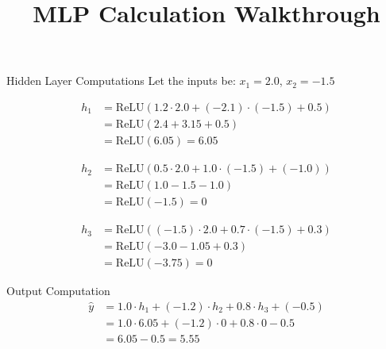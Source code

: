 \documentclass{beamer}
\title{MLP Calculation Walkthrough}
\author{}
\date{}
\begin{document}
\frame{\titlepage}

\begin{frame}{Hidden Layer Computations}
Let the inputs be: $x_1 = 2.0$, $x_2 = -1.5$

\begin{tcolorbox}[title=Neuron 1]
\begin{align*}
h_1 &= \text{ReLU}(1.2 \cdot 2.0 + (-2.1) \cdot (-1.5) + 0.5) \\
    &= \text{ReLU}(2.4 + 3.15 + 0.5) \\
    &= \text{ReLU}(6.05) = 6.05
\end{align*}
\end{tcolorbox}

\begin{tcolorbox}[title=Neuron 2]
\begin{align*}
h_2 &= \text{ReLU}(0.5 \cdot 2.0 + 1.0 \cdot (-1.5) + (-1.0)) \\
    &= \text{ReLU}(1.0 - 1.5 - 1.0) \\
    &= \text{ReLU}(-1.5) = 0
\end{align*}
\end{tcolorbox}

\begin{tcolorbox}[title=Neuron 3]
\begin{align*}
h_3 &= \text{ReLU}((-1.5) \cdot 2.0 + 0.7 \cdot (-1.5) + 0.3) \\
    &= \text{ReLU}(-3.0 - 1.05 + 0.3) \\
    &= \text{ReLU}(-3.75) = 0
\end{align*}
\end{tcolorbox}
\end{frame}

\begin{frame}{Output Computation}
\begin{align*}
\hat{y} &= 1.0 \cdot h_1 + (-1.2) \cdot h_2 + 0.8 \cdot h_3 + (-0.5) \\
        &= 1.0 \cdot 6.05 + (-1.2) \cdot 0 + 0.8 \cdot 0 - 0.5 \\
        &= 6.05 - 0.5 = \boxed{5.55}
\end{align*}
\end{frame}
\end{document}
